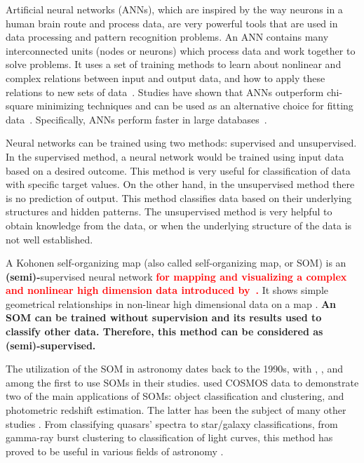 Artificial neural networks (ANNs), which are inspired by the way neurons in a human brain route and process data, are very powerful tools that are used in data processing and pattern recognition problems.
An ANN contains many interconnected units (nodes or neurons) which process data and work together to solve problems.
It uses a set of training methods to learn about nonlinear and complex relations between input and output data, and how to apply these relations to new sets of data~\citep[e.g.][]{Hossein14,Hossein16a,Hossein16b,Ellison16a, Ellison16b}.
Studies have shown that ANNs outperform chi-square minimizing techniques and can be used as an alternative choice for fitting data~\citep[e.g.][]{Marquez91}.
Specifically, ANNs perform faster in large databases~\citep[][]{Gulati97}.

Neural networks can be trained using two methods: supervised and unsupervised.
In the supervised method, a neural network would be trained using input data based on a desired outcome.
This method is very useful for classification of data with specific target values.
On the other hand, in the unsupervised method there is no prediction of output.
This method classifies data based on their underlying structures and hidden patterns.
The unsupervised method is very helpful to obtain knowledge from the data, or when the underlying structure of the data is not well established.

A Kohonen self-organizing map (also called self-organizing map, or SOM) is an \textbf{(semi)-}supervised neural network \textbf{\textcolor{red}{for mapping and visualizing a complex and nonlinear high dimension data introduced by~\citet{Kohonen82}.}}
It shows simple geometrical relationships in non-linear high dimensional data on a map \citep{Kohonen98}.
\textbf{An SOM can be trained without supervision and its results used to classify other data.
Therefore, this method can be considered as (semi)-supervised.}

The utilization of the SOM in astronomy dates back to the 1990s, with \citet[][]{Odewahn92}, \citet[][]{Hernandez94}, and \citet[][]{Murtagh95} among the first to use SOMs in their studies.
\citet{Geach12} used COSMOS data to demonstrate two of the main applications of SOMs: object classification and clustering, and photometric redshift estimation. The latter has been the subject of many other studies \citep[e.g.][]{Kind14a}.
From classifying quasars' spectra to star/galaxy classifications, from gamma-ray burst clustering to classification of light curves, this method has proved to be useful in various fields of astronomy \citep[e.g.][]{Maehoenen95, Miller96, Andreon00, Balastegui01, Rajaniemi02, Brett04, Scaringi09}.


